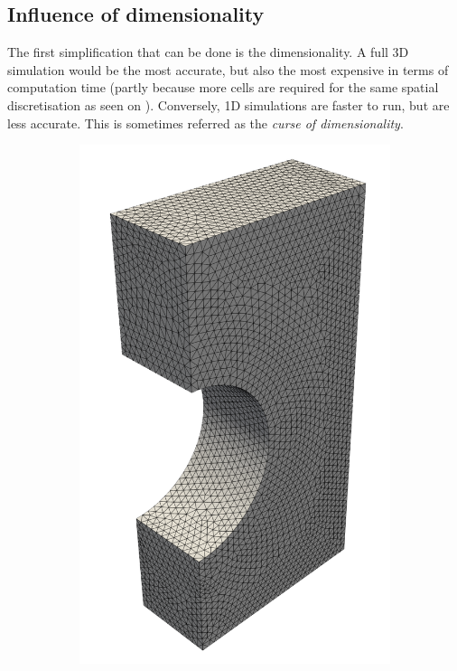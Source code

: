 \subsection{Influence of dimensionality}

The first simplification that can be done is the dimensionality.
A full 3D simulation would be the most accurate, but also the most expensive in terms of computation time (partly because more cells are required for the same spatial discretisation as seen on ).
Conversely, 1D simulations are faster to run, but are less accurate.
This is sometimes referred as the \textit{curse of dimensionality}.

\begin{figure}
    \centering
    \begin{subfigure}{0.27\linewidth}
        \includegraphics[width=\linewidth]{Figures/Chapter3/monoblocks/mesh_3d.png}

\end{subfigure}
\end{figure}
